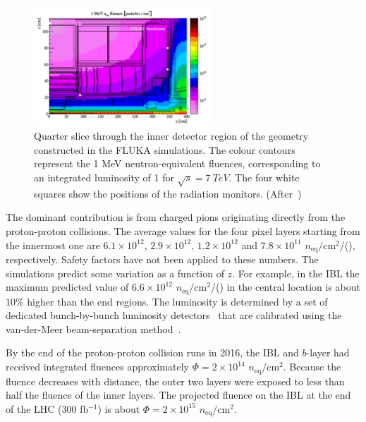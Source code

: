\begin{figure}[htpb!]
\centering
\includegraphics[width=0.6\textwidth]{Fluka2014.pdf}
\caption{Quarter  slice  through  the  inner  detector  region  of  the 
  geometry  constructed  in  the  FLUKA simulations.   The  colour  contours 
  represent  the  1 MeV  neutron-equivalent  fluences, 
  corresponding  to  an integrated luminosity of 1 \invfb for $\sqrt{s}=7~TeV$.
The four white squares show the positions of the radiation monitors. (After~\cite{Aad:2014mta})}
\label{fig:fluenceoverview2}
\end{figure}


 The dominant contribution is from charged 
pions originating directly from the proton-proton collisions. The average values for the four pixel layers 
starting from the innermost one are $6.1\times 10^{12}$, $2.9\times 10^{12}$, $1.2\times 10^{12}$ 
and $7.8\times 10^{11}$ $n_\text{eq}/\text{cm}^2$/(\invfb), respectively. Safety factors have not been applied to 
these numbers.  The simulations predict some variation as a function of $z$.  For example, in the IBL 
the maximum predicted value of $6.6\times 10^{12}$ $n_\text{eq}/\text{cm}^2$/(\invfb) in the central location is 
about $10\%$ higher than the end regions. 
The luminosity is 
determined by a set of dedicated bunch-by-bunch luminosity detectors~\cite{Aaboud:2016hhf} that are 
calibrated using the van-der-Meer beam-separation method~\cite{vanderMeer:296752}.

By the end of the proton-proton collision runs in 2016, the IBL and $b$-layer had received integrated 
fluences approximately $\Phi=2\times 10^{14}$ $n_\text{eq}/\text{cm}^{2}$. Because the fluence 
decreases with distance, the outer two layers were exposed to less than half the fluence of the inner 
layers. The projected fluence on the IBL at the end of the LHC (300 fb$^{-1}$) is about 
$\Phi=2\times 10^{15}$ $n_\text{eq}/\text{cm}^{2}$. 


